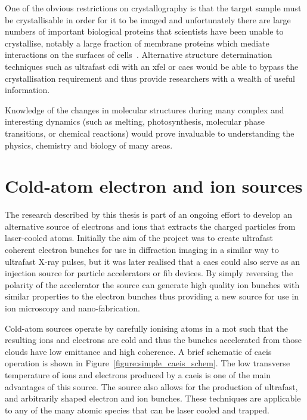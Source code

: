 One of the obvious restrictions on crystallography is that the target sample must be crystallisable in order for it to be imaged and unfortunately there are large numbers of important biological proteins that scientists have been unable to crystallise, notably a large fraction of membrane proteins which mediate interactions on the surfaces of cells~\cite{geerlof_impact_2006}.
Alternative structure determination techniques such as ultrafast \gls{cdi} with an \gls{xfel} or \gls{caes} would be able to bypass the crystallisation requirement and thus provide researchers with a wealth of useful information.

Knowledge of the changes in molecular structures during many complex and interesting dynamics (such as melting, photosynthesis, molecular phase transitions, or chemical reactions) would prove invaluable to understanding the physics, chemistry and biology of many areas.

\section{Cold-atom electron and ion sources}

The research described by this thesis is part of an ongoing effort to develop an alternative source of electrons and ions that extracts the charged particles from laser-cooled atoms.
Initially the aim of the project was to create ultrafast coherent electron bunches for use in diffraction imaging in a similar way to ultrafast X-ray pulses, but it was later realised that a \gls{caes} could also serve as an injection source for particle accelerators or \gls{fib} devices.
By simply reversing the polarity of the accelerator the source can generate high quality ion bunches with similar properties to the electron bunches thus providing a new source for use in ion microscopy and nano-fabrication.

Cold-atom sources operate by carefully ionising atoms in a \gls{mot} such that the resulting ions and electrons are cold and thus the bunches accelerated from those clouds have low emittance and high coherence.
A brief schematic of \gls{caeis} operation is shown in Figure~\ref{figure:simple_caeis_schem}.
The low transverse temperature of ions and electrons produced by a \gls{caeis} is one of the main advantages of this source.
The source also allows for the production of ultrafast, and arbitrarily shaped electron and ion bunches.
These techniques are applicable to any of the many atomic species that can be laser cooled and trapped.

